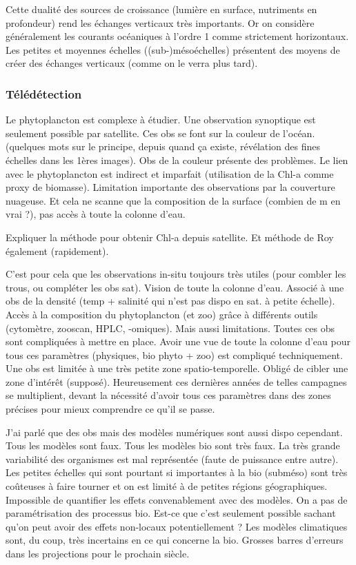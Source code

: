 \documentclass[master]{subfiles}
\begin{document}
Cette dualité des sources de croissance (lumière en surface, nutriments en profondeur) rend les échanges verticaux très importants.
Or on considère généralement les courants océaniques à l'ordre 1 comme strictement horizontaux.
Les petites et moyennes échelles ((sub-)mésoéchelles) présentent des moyens de créer des échanges verticaux (comme on le verra plus tard).

\subsubsection{Télédétection}
\label{sec:teledetection}

Le phytoplancton est complexe à étudier.
Une observation synoptique est seulement possible par satellite.
Ces obs se font sur la couleur de l'océan. (quelques mots sur le principe, depuis quand ça existe, révélation des fines échelles dans les 1ères images).
Obs de la couleur présente des problèmes. Le lien avec le phytoplancton est indirect et imparfait (utilisation de la Chl-a comme proxy de biomasse). Limitation importante des observations par la couverture nuageuse. Et cela ne scanne que la composition de la surface (combien de m en vrai ?), pas accès à toute la colonne d'eau.

Expliquer la méthode pour obtenir Chl-a depuis satellite. Et méthode de Roy également (rapidement).

C'est pour cela que les observations in-situ toujours très utiles (pour combler les trous, ou compléter les obs sat). Vision de toute la colonne d'eau. Associé à une obs de la densité (temp + salinité qui n'est pas dispo en sat. à petite échelle).
Accès à la composition du phytoplancton (et zoo) grâce à différents outils (cytomètre, zooscan, HPLC, -omiques).
Mais aussi limitations. Toutes ces obs sont compliquées à mettre en place. Avoir une vue de toute la colonne d'eau pour tous ces paramètres (physiques, bio phyto + zoo) est compliqué techniquement. Une obs est limitée à une très petite zone spatio-temporelle. Obligé de cibler une zone d'intérêt (supposé).
Heureusement ces dernières années de telles campagnes se multiplient, devant la nécessité d'avoir tous ces paramètres dans des zones précises pour mieux comprendre ce qu'il se passe.

J'ai parlé que des obs mais des modèles numériques sont aussi dispo cependant.
Tous les modèles sont faux. Tous les modèles bio sont très faux.
La très grande variabilité des organismes est mal représentée (faute de puissance entre autre). Les petites échelles qui sont pourtant si importantes à la bio (subméso) sont très coûteuses à faire tourner et on est limité à de petites régions géographiques. Impossible de quantifier les effets convenablement avec des modèles.
On a pas de paramétrisation des processus bio. Est-ce que c'est seulement possible sachant qu'on peut avoir des effets non-locaux potentiellement ?
Les modèles climatiques sont, du coup, très incertains en ce qui concerne la bio.
Grosses barres d'erreurs dans les projections pour le prochain siècle.
\end{document}
